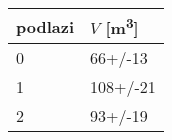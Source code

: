 \begin{tabular}{ll}
\toprule
podlazi & $V$ [\si{m^3}] \\
\midrule
0 &        66+/-13 \\
1 &       108+/-21 \\
2 &        93+/-19 \\
\bottomrule
\end{tabular}

